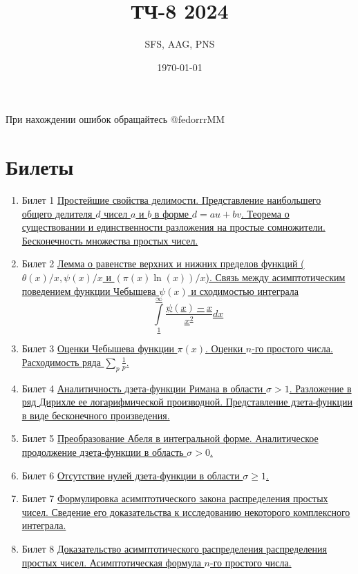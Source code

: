 \documentclass[a4paper,12pt]{article}
\title{ТЧ-8 2024}
\author{SFS, AAG, PNS}
\date{\today}
\newcommand{\TE}{\theta}
\newcommand{\SI}{\psi}
\newcommand{\IL}{\int\limits}
\newcommand{\os}{\left(}
\newcommand{\cs}{\right)}
\begin{document}
\maketitle
При нахождении ошибок обращайтесь @fedorrrMM\\


\tableofcontents
\newpage
\section{Билеты}
\begin{enumerate}
\item{Билет 1}
 \hyperlink{bil1}{Простейшие свойства делимости. Представление наибольшего общего делителя $d$ чисел $a$ и $b$ в форме $d = au+bv$. Теорема о существовании и единственности разложения на простые сомножители. Бесконечность множества простых чисел.}
\item{Билет 2}
 \hyperlink{bil2}{Лемма о равенстве верхних и нижних пределов функций ($\TE(x)/x, \SI(x)/x$ и $\os\pi(x)\ln(x)\cs/x$). Связь между асимптотическим поведением функции Чебышева $\SI(x)$ и сходимостью интеграла $$\IL_1^\infty \frac{\SI(x)-x}{x^2}dx$$}

\item{Билет 3}
\hyperlink{bil3}{Оценки Чебышева функции $\pi(x)$. Оценки $n$-го простого числа. Расходимость ряда $\sum_p \frac{1}{p}$.}

\item{Билет 4}
\hyperlink{bil4}{Аналитичность дзета-функции Римана в области $\sigma > 1$. Разложение в ряд Дирихле ее логарифмической производной. Представление дзета-функции в виде бесконечного произведения.}

\item{Билет 5}
\hyperlink{bil5}{Преобразование Абеля в интегральной форме. Аналитическое продолжение дзета-функции в область $\sigma > 0$.}

\item{Билет 6}
\hyperlink{bil6}{Отсутствие нулей дзета-функции в области $\sigma \ge 1$.}

\item{Билет 7}
\hyperlink{bil7}{Формулировка асимптотического закона распределения простых чисел. Сведение его доказательства к исследованию некоторого комплексного интеграла.}

\item{Билет 8}
\hyperlink{bil8}{Доказательство асимптотического распределения распределения простых чисел. Асимптотическая формула $n$-го простого числа.}



\end{enumerate}
\end{document}
